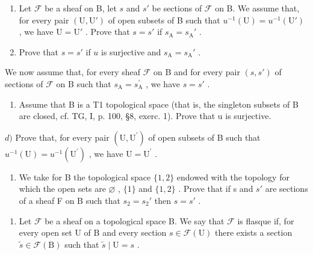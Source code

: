 \begin{enumerate}
\def\labelenumi{\alph{enumi})}
\item
  Let \(\mathcal{F}\) be a sheaf on B, let \(s\) and \(s'\) be sections of \(\mathcal{F}\) on B. We assume that, for every pair \((\mathrm{U},\mathrm{U}')\) of open subsets of B such that \(u^{-1}(\mathrm{U}) = u^{-1}(\mathrm{U}')\) , we have \(\mathrm{U} = \mathrm{U}'\) . Prove that \(s = s'\) if \(s_{\mathrm{A}} = s_{\mathrm{A}}'\) .
\item
  Prove that \(s = s'\) if \(u\) is surjective and \(s_{\mathrm{A}} = s_{\mathrm{A}}'\) .
\end{enumerate}

We now assume that, for every sheaf \(\mathcal{F}\) on B and for every pair \((s,s')\) of sections of \(\mathcal{F}\) on B such that \(s_{\mathrm{A}} = s_{\mathrm{A}}^{\prime}\) , we have \(s = s'\) .

\begin{enumerate}
\def\labelenumi{\alph{enumi})}
\setcounter{enumi}{2}
\tightlist
\item
  Assume that B is a T1 topological space (that is, the singleton subsets of B are closed, cf. TG, I, p. 100, §8, exerc. 1). Prove that u is surjective.
\end{enumerate}

\(d)\) Prove that, for every pair \((\mathrm{U},\mathrm{U}^{\prime})\) of open subsets of B such that \(u^{-1}(\mathrm{U}) = u^{-1}(\mathrm{U}^{\prime})\) , we have \(\mathrm{U} = \mathrm{U}^{\prime}\) .

\begin{enumerate}
\def\labelenumi{\alph{enumi})}
\setcounter{enumi}{4}
\tightlist
\item
  We take for B the topological space \(\{1,2\}\) endowed with the topology for which the open sets are \(\varnothing\) , \(\{1\}\) and \(\{1,2\}\) . Prove that if s and \(s'\) are sections of a sheaf F on B such that \(s_{2}=s_{2}'\) then \(s=s'\) .
\end{enumerate}

\begin{enumerate}
\def\labelenumi{\arabic{enumi})}
\setcounter{enumi}{5}
\tightlist
\item
  Let \(\mathcal{F}\) be a sheaf on a topological space B. We say that \(\mathcal{F}\) is flasque if, for every open set U of B and every section \(s \in \mathcal{F}(\mathrm{U})\) there exists a section \(\widetilde{s} \in \mathcal{F}(\mathrm{B})\) such that \(\widetilde{s} \mid \mathrm{U} = s\) .
\end{enumerate}


